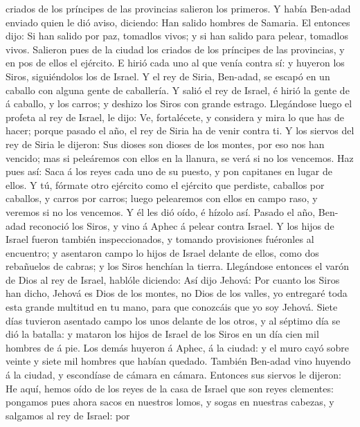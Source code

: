 criados de los príncipes de las provincias salieron los primeros. Y
había Ben-adad enviado quien le dió aviso, diciendo: Han salido hombres
de Samaria.  El entonces dijo: Si han salido por paz,
tomadlos vivos; y si han salido para pelear, tomadlos vivos.
 Salieron pues de la ciudad los criados de los príncipes de
las provincias, y en pos de ellos el ejército.  E hirió
cada uno al que venía contra sí: y huyeron los Siros, siguiéndolos los
de Israel. Y el rey de Siria, Ben-adad, se escapó en un caballo con
alguna gente de caballería.  Y salió el rey de Israel, é
hirió la gente de á caballo, y los carros; y deshizo los Siros con
grande estrago.  Llegándose luego el profeta al rey de
Israel, le dijo: Ve, fortalécete, y considera y mira lo que has de
hacer; porque pasado el año, el rey de Siria ha de venir contra ti.
 Y los siervos del rey de Siria le dijeron: Sus dioses son
dioses de los montes, por eso nos han vencido; mas si peleáremos con
ellos en la llanura, se verá si no los vencemos.  Haz pues
así: Saca á los reyes cada uno de su puesto, y pon capitanes en lugar de
ellos.  Y tú, fórmate otro ejército como el ejército que
perdiste, caballos por caballos, y carros por carros; luego pelearemos
con ellos en campo raso, y veremos si no los vencemos. Y él les dió
oído, é hízolo así.  Pasado el año, Ben-adad reconoció los
Siros, y vino á Aphec á pelear contra Israel.  Y los hijos
de Israel fueron también inspeccionados, y tomando provisiones fuéronles
al encuentro; y asentaron campo lo hijos de Israel delante de ellos,
como dos rebañuelos de cabras; y los Siros henchían la tierra.
 Llegándose entonces el varón de Dios al rey de Israel,
hablóle diciendo: Así dijo Jehová: Por cuanto los Siros han dicho,
Jehová es Dios de los montes, no Dios de los valles, yo entregaré toda
esta grande multitud en tu mano, para que conozcáis que yo soy Jehová.
 Siete días tuvieron asentado campo los unos delante de los
otros, y al séptimo día se dió la batalla: y mataron los hijos de Israel
de los Siros en un día cien mil hombres de á pie.  Los
demás huyeron á Aphec, á la ciudad: y el muro cayó sobre veinte y siete
mil hombres que habían quedado. También Ben-adad vino huyendo á la
ciudad, y escondíase de cámara en cámara.  Entonces sus
siervos le dijeron: He aquí, hemos oído de los reyes de la casa de
Israel que son reyes clementes: pongamos pues ahora sacos en nuestros
lomos, y sogas en nuestras cabezas, y salgamos al rey de Israel: por
